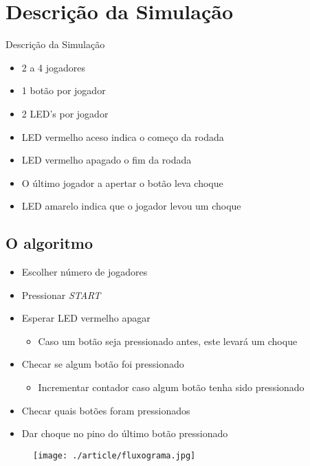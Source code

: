 \documentclass{beamer}
\begin{document}
\section{Descri\c{c}\~ao da Simula\c{c}\~ao}
  \begin{frame}{Descri\c{c}\~ao da Simula\c{c}\~ao}
	\begin{itemize}
	  \item 	2 a 4 jogadores
	  \item		1 bot\~ao por jogador
	  \item		2 LED's por jogador
	  \item		LED vermelho aceso indica o começo da rodada
	  \item		LED vermelho apagado o fim da rodada
	  \item		O \'ultimo jogador a apertar o botão leva choque
	  \item		LED amarelo indica que o jogador levou um choque
	  \end{itemize}
  \end{frame}

  \subsection{O algoritmo}
    \begin{frame}
      \begin{itemize}
	\item	Escolher n\'umero de jogadores
	\item	Pressionar \textit{START}
	\item	Esperar LED vermelho apagar
	  \begin{itemize}
	   \item	Caso um bot\~ao seja pressionado antes, este levará um choque
	  \end{itemize}
	\item	Checar se algum bot\~ao foi pressionado
	  \begin{itemize}
	    \item	Incrementar contador caso algum bot\~ao tenha sido pressionado
	  \end{itemize}
	\item	Checar quais bot\~oes foram pressionados
	\item 	Dar choque no pino do \'ultimo bot\~ao pressionado
      \end{itemize}
    \end{frame}
    \begin{frame}
      \begin{figure}[ht]
	  \centering
	  \texttt{[image: ./article/fluxograma.jpg]}
      \end{figure}      
    \end{frame}
\end{document}
